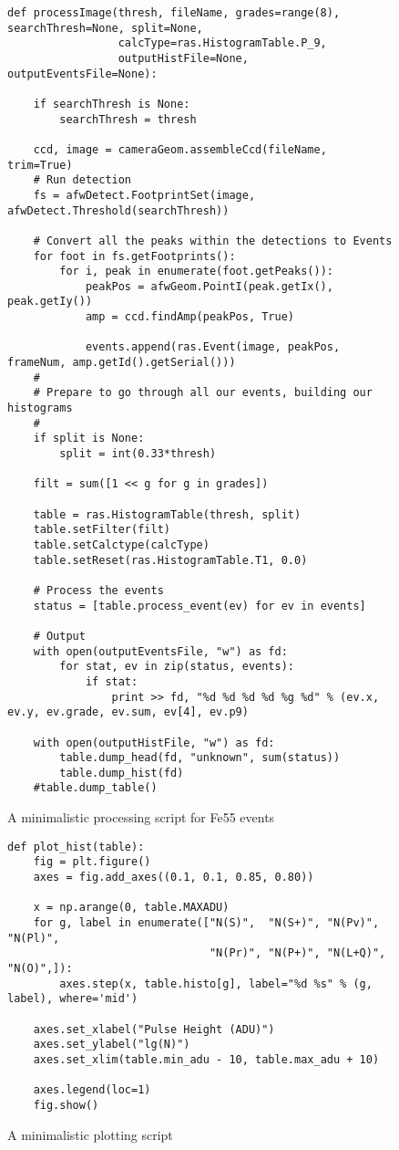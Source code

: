 \documentclass[12pt]{article}
\begin{document}
\begin{figure}
\lstset{language=Python}
\begin{lstlisting}
def processImage(thresh, fileName, grades=range(8), searchThresh=None, split=None,
                 calcType=ras.HistogramTable.P_9,
                 outputHistFile=None, outputEventsFile=None):

    if searchThresh is None:
        searchThresh = thresh

    ccd, image = cameraGeom.assembleCcd(fileName, trim=True)
    # Run detection
    fs = afwDetect.FootprintSet(image, afwDetect.Threshold(searchThresh))

    # Convert all the peaks within the detections to Events
    for foot in fs.getFootprints():
        for i, peak in enumerate(foot.getPeaks()):
            peakPos = afwGeom.PointI(peak.getIx(), peak.getIy())
            amp = ccd.findAmp(peakPos, True)
                
            events.append(ras.Event(image, peakPos, frameNum, amp.getId().getSerial()))
    #
    # Prepare to go through all our events, building our histograms
    #
    if split is None:
        split = int(0.33*thresh)

    filt = sum([1 << g for g in grades])

    table = ras.HistogramTable(thresh, split)
    table.setFilter(filt)
    table.setCalctype(calcType)
    table.setReset(ras.HistogramTable.T1, 0.0)

    # Process the events
    status = [table.process_event(ev) for ev in events]

    # Output
    with open(outputEventsFile, "w") as fd:
        for stat, ev in zip(status, events):
            if stat:
                print >> fd, "%d %d %d %d %g %d" % (ev.x, ev.y, ev.grade, ev.sum, ev[4], ev.p9)

    with open(outputHistFile, "w") as fd:
        table.dump_head(fd, "unknown", sum(status))
        table.dump_hist(fd)
    #table.dump_table()
\end{lstlisting}
\caption{A minimalistic processing script for Fe55 events}
\label{processImage}
\end{figure}

\begin{figure}
\lstset{language=Python}
\begin{lstlisting}
def plot_hist(table):
    fig = plt.figure()
    axes = fig.add_axes((0.1, 0.1, 0.85, 0.80))

    x = np.arange(0, table.MAXADU)
    for g, label in enumerate(["N(S)",  "N(S+)", "N(Pv)",  "N(Pl)",
                               "N(Pr)", "N(P+)", "N(L+Q)", "N(O)",]):
        axes.step(x, table.histo[g], label="%d %s" % (g, label), where='mid')

    axes.set_xlabel("Pulse Height (ADU)")
    axes.set_ylabel("lg(N)")
    axes.set_xlim(table.min_adu - 10, table.max_adu + 10)

    axes.legend(loc=1)
    fig.show()
\end{lstlisting}
\caption{A minimalistic plotting script}
\label{plot_hist}
\end{figure}
\end{document}
